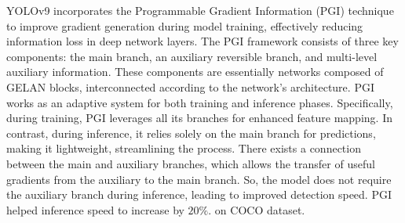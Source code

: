 YOLOv9 incorporates the Programmable Gradient Information (PGI) technique to improve gradient generation during model training, effectively reducing information loss in deep network layers. The PGI framework consists of three key components: the main branch, an auxiliary reversible branch, and multi-level auxiliary information. These components are essentially networks composed of GELAN blocks, interconnected according to the network's architecture. PGI works as an adaptive system for both training and inference phases. Specifically, during training, PGI leverages all its branches for enhanced feature mapping. In contrast, during inference, it relies solely on the main branch for predictions, making it lightweight, streamlining the process. There exists a connection between the main and auxiliary branches, which allows the transfer of useful gradients from the auxiliary to the main branch. So, the model does not require the auxiliary branch during inference, leading to improved detection speed. PGI helped inference speed to increase by $20\%$.\cite{wang2024yolov9} on COCO dataset.


